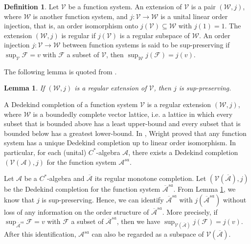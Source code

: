 \documentclass[12pt]{amsart}
\newtheorem{lem}[thm]{Lemma}
\theoremstyle{definition}
\newtheorem{defn}[thm]{Definition}
\theoremstyle{remark}
\numberwithin{equation}{section}
\begin{document}
\begin{defn}
	Let $\mathcal{V}$ be a function system. An extension of $\mathcal{V}$  is a pair $(\mathcal{W}, j)$, where $\mathcal{W}$ is another  function system, and $j:\mathcal{V}\to \mathcal{W}$ is a  unital linear order injection, that is, an order isomorphism onto $j(\mathcal{V})\subseteq\mathcal{W}$ with $j(1)=1$. The extension $(\mathcal{W}, j)$ is regular if $j(\mathcal{V})$ is a regular subspace of $\mathcal{W}$.  An order  injection $j:\mathcal{V}\to\mathcal{W}$ between function systems is said to be sup-preserving if $\sup_{\mathcal{V}}\mathcal{F}=v$ with $\mathcal{F}$
	a subset of $\mathcal{V}$, then $\sup_{\mathcal{W}}j\mathcal{(F)}=j(v)$.   
\end{defn}
The following  lemma is quoted from  \cite[Lemma 2.4]{Hamana}.
\begin{lem}\label{regular-sup-preserving}
	If $(\mathcal{W}, j)$ is a regular extension of $\mathcal{V}$, then $j$ is sup-preserving.	
\end{lem}

A Dedekind completion of a function system $\mathcal{V}$ is a regular extension  $( \mathcal{W},j)$, where $\mathcal{W}$ is a boundedly complete vector lattice, i.e.  a lattice in which every subset that is bounded above has a least upper-bound and every subset that is bounded below has a greatest lower-bound. In \cite[Lemma 1.2, Theorem 2.9]{Wright}, Wright proved that any function system has a unique Dedekind completion up to  linear order isomorphism. In particular, for each (unital) $C^*$-algebra $\mathcal{A}$, there exists a Dedekind completion $\left( \mathcal{V}(\mathcal{A}),j\right)$ for the function system $\mathcal{A}^{sa}$. 

Let $\mathcal{A}$ be a $C^*$-algebra and $\overline{\mathcal{A}}$ its regular monotone completion. Let  $\left( \mathcal{V}(\overline{\mathcal{A}}),j\right)$ be the Dedekind completion for the function system $\overline{\mathcal{A}}^{sa}$. From  Lemma \ref{regular-sup-preserving}, we know that  $j$ is sup-preserving. Hence, we can identify $\overline{\mathcal{A}}^{sa}$ with $j(\overline{\mathcal{A}}^{sa})$ without loss of any information on the order structure of $\overline{\mathcal{A}}^{sa}$. More precisely, if  $\sup_{\overline{\mathcal{A}}^{sa}}\mathcal{F}=v $ with $\mathcal{F}$
a subset of $\overline{\mathcal{A}}^{sa}$, then we have  $\sup_{\mathcal{V}(\overline{\mathcal{A}})}j(\mathcal{F})=j(v)$. After this identification,  $\mathcal{A}^{sa}$ can also be regarded   as a subspace  of $\mathcal{V}(\overline{\mathcal{A}})$. 
\end{document}
